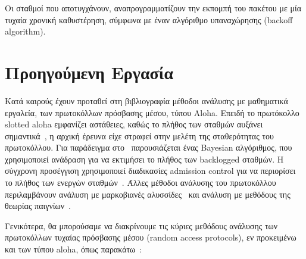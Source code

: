 \documentclass[12pt]{report}
\begin{document}
Οι σταθμοί που αποτυγχάνουν, αναπρογραμματίζουν την εκπομπή του πακέτου με μία τυχαία χρονική καθυστέρηση, σύμφωνα με έναν αλγόριθμο υπαναχώρησης (\textlatin{backoff algorithm}).

\section{Προηγούμενη Εργασία}
Κατά καιρούς έχουν προταθεί στη βιβλιογραφία μέθοδοι ανάλυσης με μαθηματικά εργαλεία, των πρωτοκόλλων πρόσβασης μέσου, τύπου \textlatin{Aloha}. Επειδή το πρωτόκολλο \textlatin{slotted aloha} εμφανίζει αστάθειες, καθώς το πλήθος των σταθμών αυξάνει σημαντικά~\cite{paper:07, paper:08}, η αρχική έρευνα είχε στραφεί στην μελέτη της σταθερότητας του πρωτοκόλλου. Για παράδειγμα στο~\cite{paper:09} παρουσιάζεται ένας \textlatin{Bayesian} αλγόριθμος, που χρησιμοποιεί ανάδραση για να εκτιμήσει το πλήθος των \textlatin{backlogged} σταθμών. Η σύγχρονη προσέγγιση χρησιμοποιεί διαδικασίες \textlatin{admission control} για να περιορίσει το πλήθος των ενεργών σταθμών~\cite{paper:07}. Άλλες μέθοδοι ανάλυσης του πρωτοκόλλου περιλαμβάνουν ανάλυση με μαρκοβιανές αλυσσίδες~\cite{paper:04, paper:05} και ανάλυση με μεθόδους της θεωρίας παιγνίων~\cite{paper:07, paper:10}.

Γενικότερα, θα μπορούσαμε να διακρίνουμε τις κύριες μεθόδους ανάλυσης των πρωτοκόλλων τυχαίας πρόσβασης μέσου (\textlatin{random access protocols}), εν προκειμένω και των τύπου \textlatin{aloha}, όπως παρακάτω~\cite{book:01}:
\end{document}
